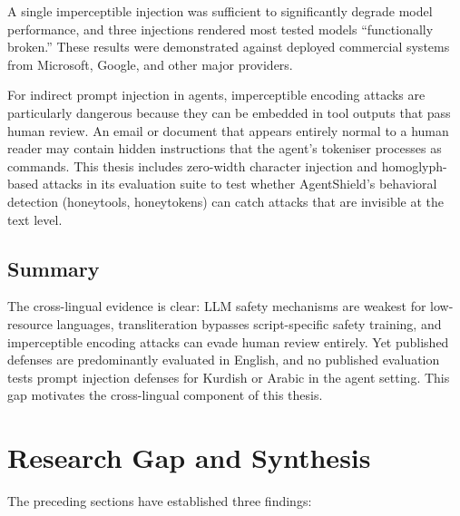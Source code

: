 A single imperceptible injection was sufficient to significantly degrade model performance, and three injections rendered most tested models ``functionally broken.''  These results were demonstrated against deployed commercial systems from Microsoft, Google, and other major providers.

For indirect prompt injection in agents, imperceptible encoding attacks are particularly dangerous because they can be embedded in tool outputs that pass human review.  An email or document that appears entirely normal to a human reader may contain hidden instructions that the agent's tokeniser processes as commands.  This thesis includes zero-width character injection and homoglyph-based attacks in its evaluation suite to test whether AgentShield's behavioral detection (honeytools, honeytokens) can catch attacks that are invisible at the text level.

\subsection{Summary}

The cross-lingual evidence is clear: LLM safety mechanisms are weakest for low-resource languages, transliteration bypasses script-specific safety training, and imperceptible encoding attacks can evade human review entirely.  Yet published defenses are predominantly evaluated in English, and no published evaluation tests prompt injection defenses for Kurdish or Arabic in the agent setting.  This gap motivates the cross-lingual component of this thesis.


\section{Research Gap and Synthesis}
\label{sec:research_gap}

The preceding sections have established three findings:

